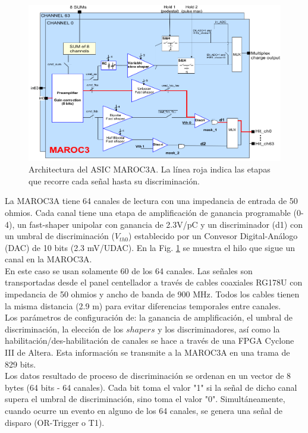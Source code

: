 \begin{figure}[h!]
\centering
\includegraphics[scale=0.5]{Figures/Maroc.png}
\caption{Architectura del ASIC MAROC3A. La línea roja indica las etapas que recorre cada señal hasta su discriminación.}
\label{Maroc}
\end{figure}


La MAROC3A tiene 64 canales de lectura con una impedancia de entrada de 50 ohmios. Cada canal tiene una etapa de amplificación de ganancia programable (0-4), un \textrm{fast-shaper} unipolar con ganancia de 2.3V/pC y un discriminador (d1) con un umbral de discriminación ($V_{th0}$) establecido por un Convesor Digital-Análogo (DAC) de 10 bits (2.3 mV/UDAC). En la Fig. \ref{Maroc} se muestra el hilo que sigue un canal en la MAROC3A.\\

En este caso se usan solamente 60 de los 64 canales. Las señales son transportadas desde el panel centellador a través de cables coaxiales RG178U con impedancia de 50 ohmios y ancho de banda de 900 MHz. Todos los cables tienen la misma distancia (2.9 m) para evitar diferencias temporales entre canales.\\

Los parámetros de configuración de: la ganancia de amplificación, el umbral de discriminación, la elección de los $shapers$ y los discriminadores, así como la habilitación/des-habilitación de canales se hace a través de una FPGA Cyclone III de Altera. Esta información se transmite a la MAROC3A en una trama de 829 bits.\\

Los datos resultado de proceso de discriminación se ordenan en un vector de 8 bytes (64 bits - 64 canales). Cada bit toma el valor "1" si la señal de dicho canal supera el umbral de discriminación, sino toma el valor "0". Simultáneamente, cuando ocurre un evento en alguno de los 64 canales, se genera una señal de disparo (OR-Trigger o T1).\\

